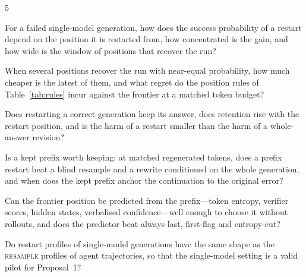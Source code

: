 \begin{rqbox}{5}
\begin{description}[leftmargin=3.2em,style=sameline,font=\bfseries,itemsep=1.5pt]
\item[RQ\,5.1] For a failed single-model generation, how does the success probability of a restart depend on the position it is restarted from, how concentrated is the gain, and how wide is the window of positions that recover the run?
\item[RQ\,5.2] When several positions recover the run with near-equal probability, how much cheaper is the latest of them, and what regret do the position rules of Table~\ref{tab:rules} incur against the frontier at a matched token budget?
\item[RQ\,5.3] Does restarting a correct generation keep its answer, does retention rise with the restart position, and is the harm of a restart smaller than the harm of a whole-answer revision?
\item[RQ\,5.4] Is a kept prefix worth keeping: at matched regenerated tokens, does a prefix restart beat a blind resample and a rewrite conditioned on the whole generation, and when does the kept prefix anchor the continuation to the original error?
\item[RQ\,5.5] Can the frontier position be predicted from the prefix---token entropy, verifier scores, hidden states, verbalised confidence---well enough to choose it without rollouts, and does the predictor beat always-last, first-flag and entropy-cut?
\item[RQ\,5.6] Do restart profiles of single-model generations have the same shape as the \textsc{resample} profiles of agent trajectories, so that the single-model setting is a valid pilot for Proposal~1?
\end{description}
\end{rqbox}


